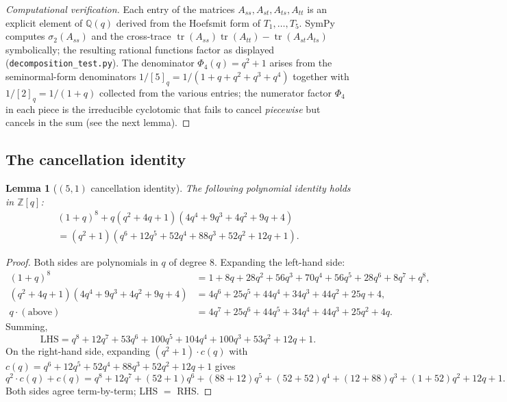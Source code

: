 \documentclass[11pt]{article}
\theoremstyle{plain}
\newtheorem{lemma}[theorem]{Lemma}
\theoremstyle{definition}
\theoremstyle{remark}
\newcommand{\Z}{\mathbb{Z}}
\newcommand{\Q}{\mathbb{Q}}
\newcommand{\trace}{\operatorname{tr}}
\begin{document}
\begin{proof}[Computational verification]
Each entry of the matrices $A_{ss},A_{st},A_{ts},A_{tt}$ is an explicit
element of $\Q(q)$ derived from the Hoefsmit form of $T_1,\ldots,T_5$.
SymPy computes $\sigma_2(A_{ss})$ and the cross-trace
$\trace(A_{ss})\trace(A_{tt}) - \trace(A_{st}A_{ts})$ symbolically; the
resulting rational functions factor as displayed
(\verb|decomposition_test.py|). The denominator $\Phi_4(q) = q^2+1$
arises from the seminormal-form denominators $1/[5]_q = 1/(1+q+q^2+q^3+q^4)$
together with $1/[2]_q = 1/(1+q)$ collected from the various entries; the
numerator factor $\Phi_4$ in each piece is the irreducible cyclotomic that
fails to cancel \emph{piecewise} but cancels in the sum (see the next lemma).
\end{proof}

\subsection{The cancellation identity}

\begin{lemma}[$(5,1)$ cancellation identity]\label{lem:identity-51}
The following polynomial identity holds in $\Z[q]$:
\begin{multline}\label{eq:identity-51}
  (1+q)^8 + q(q^2+4q+1)(4q^4+9q^3+4q^2+9q+4) \\
    = (q^2+1)(q^6 + 12q^5 + 52q^4 + 88q^3 + 52q^2 + 12q + 1).
\end{multline}
\end{lemma}

\begin{proof}
Both sides are polynomials in $q$ of degree $8$. Expanding the left-hand side:
\begin{align*}
  (1+q)^8 &= 1 + 8q + 28q^2 + 56q^3 + 70q^4 + 56q^5 + 28q^6 + 8q^7 + q^8, \\
  (q^2+4q+1)(4q^4+9q^3+4q^2+9q+4) &= 4q^6 + 25q^5 + 44q^4 + 34q^3 + 44q^2 + 25q + 4, \\
  q\cdot(\text{above}) &= 4q^7 + 25q^6 + 44q^5 + 34q^4 + 44q^3 + 25q^2 + 4q.
\end{align*}
Summing,
\[
  \mathrm{LHS} = q^8 + 12q^7 + 53q^6 + 100q^5 + 104q^4 + 100q^3 + 53q^2 + 12q + 1.
\]
On the right-hand side, expanding $(q^2+1)\cdot c(q)$ with $c(q) = q^6 + 12q^5 + 52q^4 + 88q^3 + 52q^2 + 12q + 1$ gives
\[
  q^2\cdot c(q) + c(q) = q^8 + 12q^7 + (52+1)q^6 + (88+12)q^5 + (52+52)q^4 + (12+88)q^3 + (1+52)q^2 + 12q + 1.
\]
Both sides agree term-by-term; LHS $=$ RHS.
\end{proof}
\end{document}
